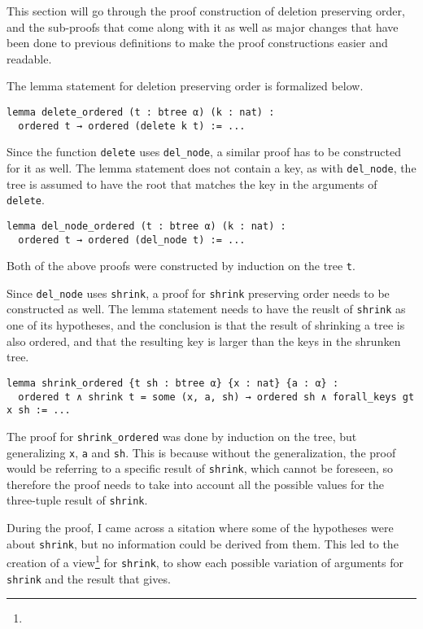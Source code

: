 This section will go through the proof construction of deletion preserving order, and the sub-proofs that come along with it as well as major changes that have been done to previous definitions to make the proof constructions easier and readable.

The lemma statement for deletion preserving order is formalized below.

\begin{lstlisting}[caption=\empty]
lemma delete_ordered (t : btree α) (k : nat) :
  ordered t → ordered (delete k t) := ...
\end{lstlisting}

Since the function \lstinline{delete} uses \lstinline{del_node}, a similar proof has to be constructed for it as well. The lemma statement does not contain a key, as with \lstinline{del_node}, the tree is assumed to have the root that matches the key in the arguments of \lstinline{delete}.

\begin{lstlisting}[caption=\empty]
lemma del_node_ordered (t : btree α) (k : nat) :
  ordered t → ordered (del_node t) := ...
\end{lstlisting}

Both of the above proofs were constructed by induction on the tree \lstinline{t}.

Since \lstinline{del_node} uses \lstinline{shrink}, a proof for \lstinline{shrink} preserving order needs to be constructed as well. The lemma statement needs to have the reuslt of \lstinline{shrink} as one of its hypotheses, and the conclusion is that the result of shrinking a tree is also ordered, and that the resulting key is larger than the keys in the shrunken tree.

\begin{lstlisting}[caption=\empty, label={lst:shrink_ordered}]
lemma shrink_ordered {t sh : btree α} {x : nat} {a : α} :
  ordered t ∧ shrink t = some (x, a, sh) → ordered sh ∧ forall_keys gt x sh := ...
\end{lstlisting}

The proof for \lstinline{shrink_ordered} was done by induction on the tree, but generalizing \lstinline{x}, \lstinline{a} and \lstinline{sh}. This is because without the generalization, the proof would be referring to a specific result of \lstinline{shrink}, which cannot be foreseen, so therefore the proof needs to take into account all the possible values for the three-tuple result of \lstinline{shrink}.

During the proof, I came across a sitation where some of the hypotheses were about \lstinline{shrink}, but no information could be derived from them. This led to the creation of a view\footnote{} for \lstinline{shrink}, to show each possible variation of arguments for \lstinline{shrink} and the result that gives.

